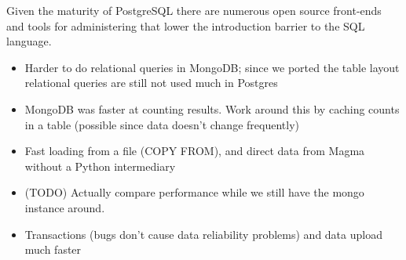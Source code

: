 \documentclass{article}
\begin{document}
Given the maturity of PostgreSQL there are numerous open source front-ends and tools for administering that lower the introduction barrier to the SQL language.

\begin{itemize}
\item Harder to do relational queries in MongoDB; since we ported the table layout relational queries are still not used much in Postgres
\item MongoDB was faster at counting results.  Work around this by caching counts in a table (possible since data doesn't change frequently)
\item Fast loading from a file (COPY FROM), and direct data from Magma without a Python intermediary
\item (TODO) Actually compare performance while we still have the mongo instance around.
\item Transactions (bugs don't cause data reliability problems) and data upload much faster
\end{itemize}
\end{document}
